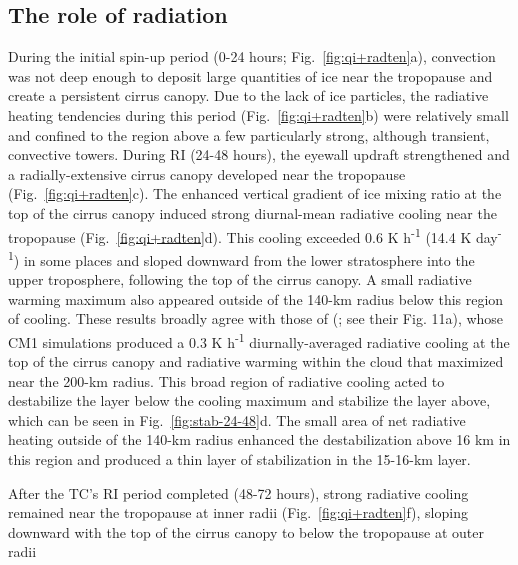 \documentclass{ametsoc}
\begin{document}
  \subsection{The role of radiation}
During the initial spin-up period (0-24 hours; Fig.~\ref{fig:qi+radten}a), convection was not deep enough to deposit large quantities of ice near the tropopause and create a persistent cirrus canopy.
Due to the lack of ice particles, the radiative heating tendencies during this period (Fig.~\ref{fig:qi+radten}b) were relatively small and confined to the region above a few particularly strong, although transient, convective towers.
During RI (24-48 hours), the eyewall updraft strengthened and a radially-extensive cirrus canopy developed near the tropopause (Fig.~\ref{fig:qi+radten}c).
The enhanced vertical gradient of ice mixing ratio at the top of the cirrus canopy induced strong diurnal-mean radiative cooling near the tropopause (Fig.~\ref{fig:qi+radten}d).
This cooling exceeded 0.6 K h\textsuperscript{-1} (14.4 K day\textsuperscript{-1}) in some places and sloped downward from the lower stratosphere into the upper troposphere, following the top of the cirrus canopy.
A small radiative warming maximum also appeared outside of the 140-km radius below this region of cooling.
These results broadly agree with those of \citeauthor{Buetal} (\citeyear{Buetal}; see their Fig. 11a), whose CM1 simulations produced a 0.3 K h\textsuperscript{-1} diurnally-averaged radiative cooling at the top of the cirrus canopy and radiative warming within the cloud that maximized near the 200-km radius.
This broad region of radiative cooling acted to destabilize the layer below the cooling maximum and stabilize the layer above, which can be seen in Fig.~\ref{fig:stab-24-48}d.
The small area of net radiative heating outside of the 140-km radius enhanced the destabilization above 16 km in this region and produced a thin layer of stabilization in the 15-16-km layer.

After the TC's RI period completed (48-72 hours), strong radiative cooling remained near the tropopause at inner radii (Fig.~\ref{fig:qi+radten}f), sloping downward with the top of the cirrus canopy to below the tropopause at outer radii
\end{document}
